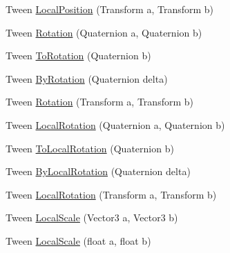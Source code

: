 \begin{DoxyCompactItemize}
\item 
Tween \mbox{\hyperlink{struct_leap_1_1_unity_1_1_leap_1_1_unity_1_1_animation_1_1_internal_1_1_transform_selector_a13cc151a11045d8a16bff858ff9e9569}{Local\+Position}} (Transform a, Transform b)
\item 
Tween \mbox{\hyperlink{struct_leap_1_1_unity_1_1_leap_1_1_unity_1_1_animation_1_1_internal_1_1_transform_selector_abecf3284e5a297d6bf198390a854a6b9}{Rotation}} (Quaternion a, Quaternion b)
\item 
Tween \mbox{\hyperlink{struct_leap_1_1_unity_1_1_leap_1_1_unity_1_1_animation_1_1_internal_1_1_transform_selector_a080ea31385ee3af81c273b2263fb3e84}{To\+Rotation}} (Quaternion b)
\item 
Tween \mbox{\hyperlink{struct_leap_1_1_unity_1_1_leap_1_1_unity_1_1_animation_1_1_internal_1_1_transform_selector_a15c9866e2852b34fe479d8d8f6f1cd44}{By\+Rotation}} (Quaternion delta)
\item 
Tween \mbox{\hyperlink{struct_leap_1_1_unity_1_1_leap_1_1_unity_1_1_animation_1_1_internal_1_1_transform_selector_a61d676d656136f211a5f89f537310595}{Rotation}} (Transform a, Transform b)
\item 
Tween \mbox{\hyperlink{struct_leap_1_1_unity_1_1_leap_1_1_unity_1_1_animation_1_1_internal_1_1_transform_selector_a9f30f4eb3bd0c6c8e259b68547801f4b}{Local\+Rotation}} (Quaternion a, Quaternion b)
\item 
Tween \mbox{\hyperlink{struct_leap_1_1_unity_1_1_leap_1_1_unity_1_1_animation_1_1_internal_1_1_transform_selector_a5e663ad6b4a88952de77b6d7f24b66fb}{To\+Local\+Rotation}} (Quaternion b)
\item 
Tween \mbox{\hyperlink{struct_leap_1_1_unity_1_1_leap_1_1_unity_1_1_animation_1_1_internal_1_1_transform_selector_a6c57db249ac4b4ff5c925b9dcd7d9e2c}{By\+Local\+Rotation}} (Quaternion delta)
\item 
Tween \mbox{\hyperlink{struct_leap_1_1_unity_1_1_leap_1_1_unity_1_1_animation_1_1_internal_1_1_transform_selector_a8c3e8953af09204d9249f58d682dc645}{Local\+Rotation}} (Transform a, Transform b)
\item 
Tween \mbox{\hyperlink{struct_leap_1_1_unity_1_1_leap_1_1_unity_1_1_animation_1_1_internal_1_1_transform_selector_af0d3dc5c78138515eb3473b5b7295280}{Local\+Scale}} (Vector3 a, Vector3 b)
\item 
Tween \mbox{\hyperlink{struct_leap_1_1_unity_1_1_leap_1_1_unity_1_1_animation_1_1_internal_1_1_transform_selector_a9b9b005150669eceafa5964610546e71}{Local\+Scale}} (float a, float b)
\item 

\end{DoxyCompactItemize}
